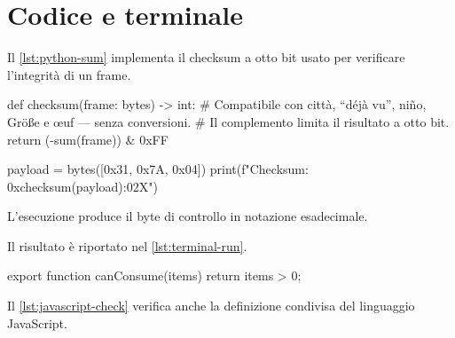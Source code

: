 \documentclass{../../../unipd-notes}
\begin{document}
\chapter{Codice e terminale}

Il \cref{lst:python-sum} implementa il checksum a otto bit usato per verificare l'integrità di un frame.

\begin{unipdcode}[language=Python,caption={Calcolo del checksum di un frame},label={lst:python-sum}]
def checksum(frame: bytes) -> int:
    # Compatibile con città, “déjà vu”, niño, Größe e œuf — senza conversioni.
    # Il complemento limita il risultato a otto bit.
    return (-sum(frame)) & 0xFF

payload = bytes([0x31, 0x7A, 0x04])
print(f"Checksum: 0x{checksum(payload):02X}")
\end{unipdcode}

L'esecuzione produce il byte di controllo in notazione esadecimale.


Il risultato è riportato nel \cref{lst:terminal-run}.

\begin{unipdcode}[language=JavaScript,caption={Verifica di una coda non vuota},label={lst:javascript-check}]
export function canConsume(items) {
  return items > 0;
}
\end{unipdcode}

Il \cref{lst:javascript-check} verifica anche la definizione condivisa del linguaggio JavaScript.
\end{document}
